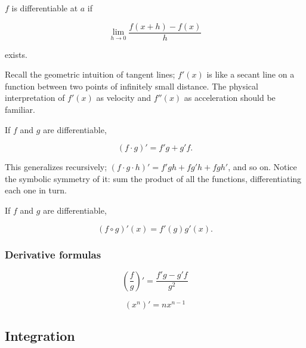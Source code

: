 \documentclass{article}
\begin{document}
\begin{definition} 
$f$ is differentiable at $a$ if

\begin{equation}
\lim_{h \to 0} \frac{f(x+h) - f(x)}{h}
\end{equation}

exists.
\end{definition}

Recall the geometric intuition of tangent lines; $f'(x)$ is like a secant line
on a function between two points of infinitely small distance. The physical
interpretation of $f'(x)$ as velocity and $f''(x)$ as acceleration should be familiar.

\begin{theorem} 

If $f$ and $g$ are differentiable, 

\begin{equation}
(f \cdot g)' = f'g + g'f.
\end{equation}


\end{theorem} 

This generalizes recursively; $(f \cdot g \cdot h)' = f'gh + fg'h + fgh'$, and
so on. Notice the symbolic symmetry of it: sum the product of all the functions,
differentiating each one in turn.

\begin{theorem}

If $f$ and $g$ are differentiable,

\begin{equation}
(f \circ g)'(x) = f'(g)g'(x).
\end{equation}


\end{theorem}

\subsubsection{Derivative formulas}

\begin{equation}
\left(\frac{f}{g}\right)' = \frac{f'g - g'f}{g^2}
\end{equation}

\begin{equation}
(x^n)' = nx^{n-1}
\end{equation}

\subsection{Integration}
\end{document}
